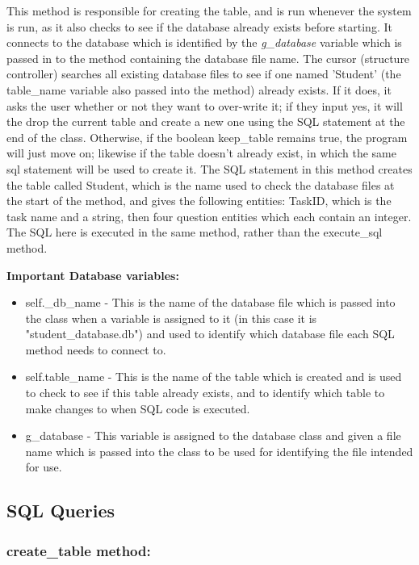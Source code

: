 This method is responsible for creating the table, and is run whenever the system is run, as it also checks to see if the database already exists before starting. It connects to the database which is identified by the \textit{g\_database} variable which is passed in to the method containing the database file name. The cursor (structure controller) searches all existing database files to see if one named 'Student' (the table\_name variable also passed into the method) already exists. If it does, it asks the user whether or not they want to over-write it; if they input yes, it will the drop the current table and create a new one using the SQL statement at the end of the class. Otherwise, if the boolean keep\_table remains true, the program will just move on; likewise if the table doesn't already exist, in which the same sql statement will be used to create it. The SQL statement in this method creates the table called Student, which is the name used to check the database files at the start of the method, and gives the following entities: TaskID, which is the task name and a string, then four question entities which each contain an integer. The SQL here is executed in the same method, rather than the execute\_sql method.

\textbf{Important Database variables: }

\begin{itemize}
	\item self.\_db\_name - This is the name of the database file which is passed into the class when a variable is assigned to it (in this case it is "student\_database.db") and used to identify which database file each SQL method needs to connect to.
	\item self.table\_name - This is the name of the table which is created and is used to check to see if this table already exists, and to identify which table to make changes to when SQL code is executed.
	\item g\_database - This variable is assigned to the database class and given a file name which is passed into the class to be used for identifying the file intended for use.
\end{itemize}

\subsection{SQL Queries}

\subsubsection{create\_table method: }

